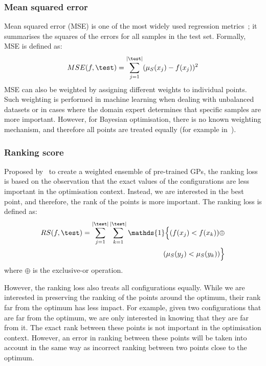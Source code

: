 \subsubsection{Mean squared error}
Mean squared error (MSE) is one of the most widely used regression metrics~\citep{EimEtAl25,GijEtAl24}; it summarises the squares of the errors for all samples in the test set. 
Formally, MSE is defined as:
\begin{equation*}
    MSE(f, \test)=\sum_{j=1}^{|\test|}(\mu_S(x_j)-f(x_j))^2
\end{equation*}
MSE can also be weighted by assigning different weights to individual points. Such weighting is performed in machine learning when dealing with unbalanced datasets or in cases where the domain expert determines that specific samples are more important. However, for Bayesian optimisation, there is no known weighting mechanism, and therefore all points are treated equally (for example in~\citet{SanEtAl2023}).
    
\subsubsection{Ranking score}
Proposed by~\citet{FeuEtAl18} to create a weighted ensemble of pre-trained GPs, the ranking loss is based on the observation that the exact values of the configurations are less important in the optimisation context. Instead, we are interested in the best point, and therefore, the rank of the points is more important. The ranking loss is defined as:
\begin{equation*}
    \begin{aligned}
        RS(f, \test) = \sum_{j=1}^{|\test|} \sum_{k=1}^{|\test|} 
        \mathds{1} \Big\{ (f(x_j) < f(x_k)) \oplus \\
        \quad (\mu_S(y_j) < \mu_S(y_k)) \Big\}
    \end{aligned}
\end{equation*}
where $\oplus$ is the exclusive-or operation.

However, the ranking loss also treats all configurations equally. While we are interested in preserving the ranking of the points around the optimum, their rank far from the optimum has less impact. For example, given two configurations that are far from the optimum, we are only interested in knowing that they are far from it. The exact rank between these points is not important in the optimisation context. However, an error in ranking between these points will be taken into account in the same way as incorrect ranking between two points close to the optimum.


